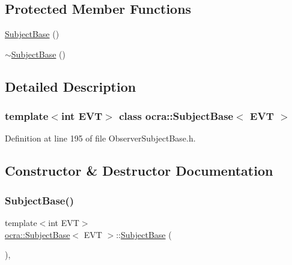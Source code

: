 \subsection*{Protected Member Functions}
{\bf }\par
\begin{DoxyCompactItemize}
\item 
\hyperlink{classocra_1_1SubjectBase_a7b662d29c5ce805a40278cbb876bbfcb}{Subject\+Base} ()
\item 
\hyperlink{classocra_1_1SubjectBase_aafd9cdf387f71e552097273d0699ec0b}{$\sim$\+Subject\+Base} ()
\end{DoxyCompactItemize}



\subsection{Detailed Description}
\subsubsection*{template$<$int E\+VT$>$\newline
class ocra\+::\+Subject\+Base$<$ E\+V\+T $>$}



Definition at line 195 of file Observer\+Subject\+Base.\+h.



\subsection{Constructor \& Destructor Documentation}
\hypertarget{classocra_1_1SubjectBase_a7b662d29c5ce805a40278cbb876bbfcb}{}\label{classocra_1_1SubjectBase_a7b662d29c5ce805a40278cbb876bbfcb} 
\subsubsection{\texorpdfstring{Subject\+Base()}{SubjectBase()}}
{\footnotesize\ttfamily template$<$int E\+VT$>$ \\
\hyperlink{classocra_1_1SubjectBase}{ocra\+::\+Subject\+Base}$<$ E\+VT $>$\+::\hyperlink{classocra_1_1SubjectBase}{Subject\+Base} (\begin{DoxyParamCaption}{ }\end{DoxyParamCaption})\hspace{0.3cm}{\ttfamily [inline]}, {\ttfamily [protected]}}



